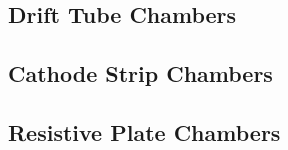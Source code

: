 



\subsection{Drift Tube Chambers}
\label{subsec:drifttube}

\subsection{Cathode Strip Chambers}
\label{subsec:csc}

\subsection{Resistive Plate Chambers}
\label{subsec:rpc}